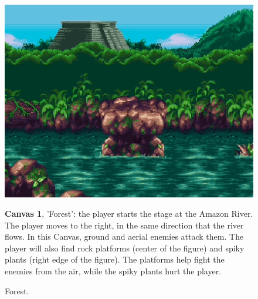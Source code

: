 \documentclass[english]{textolivre}
\begin{document}
\begin{figure}[htbp]
\begin{minipage}[t]{.47\textwidth}
\vspace{0pt}
\includegraphics[width=\textwidth]{fig-005.png}
\caption{Forest.}
\label{fig-005}
\end{minipage}
\hfill
\begin{minipage}[t]{.47\textwidth}
\vspace{2pt}
\textbf{Canvas 1}, 'Forest': the player starts the stage at the Amazon River. The player moves to the right, in the same direction that the river flows. In this Canvas, ground and aerial enemies attack them. The player will also find rock platforms (center of the figure) and spiky plants (right edge of the figure). The platforms help fight the enemies from the air, while the spiky plants hurt the player.
\end{minipage}
\end{figure}
\end{document}
